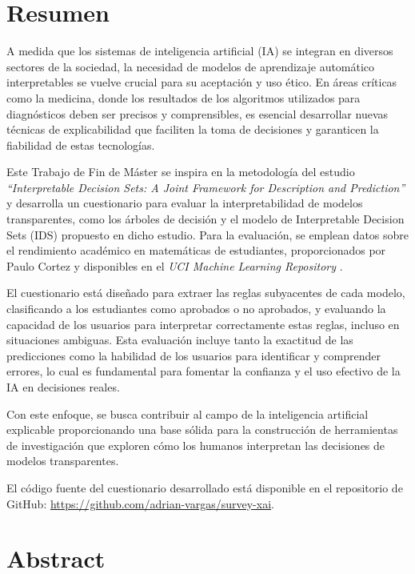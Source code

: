 \chapter{Resumen}

A medida que los sistemas de inteligencia artificial (IA) se integran en diversos sectores de la sociedad, la necesidad de modelos de aprendizaje automático interpretables se vuelve crucial para su aceptación y uso ético. En áreas críticas como la medicina, donde los resultados de los algoritmos utilizados para diagnósticos deben ser precisos y comprensibles, es esencial desarrollar nuevas técnicas de explicabilidad que faciliten la toma de decisiones y garanticen la fiabilidad de estas tecnologías.

Este Trabajo de Fin de Máster se inspira en la metodología del estudio \emph{“Interpretable Decision Sets: A Joint Framework for Description and Prediction”} \cite{lakkaraju-2016} y desarrolla un cuestionario para evaluar la interpretabilidad de modelos transparentes, como los árboles de decisión y el modelo de Interpretable Decision Sets (IDS) propuesto en dicho estudio. Para la evaluación, se emplean datos sobre el rendimiento académico en matemáticas de estudiantes, proporcionados por Paulo Cortez y disponibles en el \emph{UCI Machine Learning Repository} \cite{cortez-2014}.

El cuestionario está diseñado para extraer las reglas subyacentes de cada modelo, clasificando a los estudiantes como aprobados o no aprobados, y evaluando la capacidad de los usuarios para interpretar correctamente estas reglas, incluso en situaciones ambiguas. Esta evaluación incluye tanto la exactitud de las predicciones como la habilidad de los usuarios para identificar y comprender errores, lo cual es fundamental para fomentar la confianza y el uso efectivo de la IA en decisiones reales.

Con este enfoque, se busca contribuir al campo de la inteligencia artificial explicable proporcionando una base sólida para la construcción de herramientas de investigación que exploren cómo los humanos interpretan las decisiones de modelos transparentes.

El código fuente del cuestionario desarrollado está disponible en el repositorio de GitHub: \href{https://github.com/adrian-vargas/survey-xai}{https://github.com/adrian-vargas/survey-xai}.



\newpage

\chapter{Abstract}

